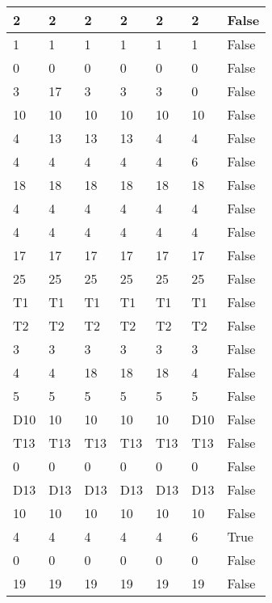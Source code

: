 \begin{longtable}[htbp]{| p{} | p{} | p{}| p{}| p{}| p{}| p{}|}
2 & 2 & 2 & 2 & 2 & 2 & False \\ \hline
1 & 1 & 1 & 1 & 1 & 1 & False \\ \hline
0 & 0 & 0 & 0 & 0 & 0 & False \\ \hline
3 & 17 & 3 & 3 & 3 & 0 & False \\ \hline
10 & 10 & 10 & 10 & 10 & 10 & False \\ \hline
4 & 13 & 13 & 13 & 4 & 4 & False \\ \hline
4 & 4 & 4 & 4 & 4 & 6 & False \\ \hline
18 & 18 & 18 & 18 & 18 & 18 & False \\ \hline
4 & 4 & 4 & 4 & 4 & 4 & False \\ \hline
4 & 4 & 4 & 4 & 4 & 4 & False \\ \hline
17 & 17 & 17 & 17 & 17 & 17 & False \\ \hline
25 & 25 & 25 & 25 & 25 & 25 & False \\ \hline
\multicolumn{1}{|l|}{T1} & \multicolumn{1}{l|}{T1} & \multicolumn{1}{l|}{T1} & \multicolumn{1}{l|}{T1} & \multicolumn{1}{l|}{T1} & \multicolumn{1}{l|}{T1} & False \\ \hline
\multicolumn{1}{|l|}{T2} & \multicolumn{1}{l|}{T2} & \multicolumn{1}{l|}{T2} & \multicolumn{1}{l|}{T2} & \multicolumn{1}{l|}{T2} & \multicolumn{1}{l|}{T2} & False \\ \hline
3 & 3 & 3 & 3 & 3 & 3 & False \\ \hline
4 & 4 & 18 & 18 & 18 & 4 & False \\ \hline
5 & 5 & 5 & 5 & 5 & 5 & False \\ \hline
\multicolumn{1}{|l|}{D10} & 10 & 10 & 10 & 10 & \multicolumn{1}{l|}{D10} & False \\ \hline
\multicolumn{1}{|l|}{T13} & \multicolumn{1}{l|}{T13} & \multicolumn{1}{l|}{T13} & \multicolumn{1}{l|}{T13} & \multicolumn{1}{l|}{T13} & \multicolumn{1}{l|}{T13} & False \\ \hline
0 & 0 & 0 & 0 & 0 & 0 & False \\ \hline
\multicolumn{1}{|l|}{D13} & \multicolumn{1}{l|}{D13} & \multicolumn{1}{l|}{D13} & \multicolumn{1}{l|}{D13} & \multicolumn{1}{l|}{D13} & \multicolumn{1}{l|}{D13} & False \\ \hline
10 & 10 & 10 & 10 & 10 & 10 & False \\ \hline
4 & 4 & 4 & 4 & 4 & 6 & True \\ \hline
0 & 0 & 0 & 0 & 0 & 0 & False \\ \hline
19 & 19 & 19 & 19 & 19 & 19 & False \\ \hline

\end{longtable}
